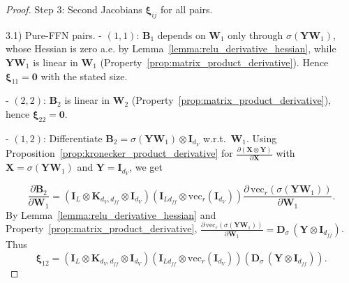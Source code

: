 \documentclass{article}
\begin{document}
\begin{proof}
Step 3: Second Jacobians $\boldsymbol{\xi}_{ij}$ for all pairs.

3.1) Pure-FFN pairs.
- $(1,1)$: $\mathbf{B}_1$ depends on $\mathbf{W}_1$ only through $\sigma(\mathbf{Y}\mathbf{W}_1)$, whose Hessian is zero a.e. by Lemma~\ref{lemma:relu_derivative_hessian}, while $\mathbf{Y}\mathbf{W}_1$ is linear in $\mathbf{W}_1$ (Property~\ref{prop:matrix_product_derivative}). Hence 
$\boldsymbol{\xi}_{11} = \mathbf{0}$ with the stated size.

- $(2,2)$: $\mathbf{B}_2$ is linear in $\mathbf{W}_2$ (Property~\ref{prop:matrix_product_derivative}), hence 
$\boldsymbol{\xi}_{22} = \mathbf{0}$.

- $(1,2)$: Differentiate $\mathbf{B}_2 = \sigma(\mathbf{Y}\mathbf{W}_1)\otimes \mathbf{I}_{d_V}$ w.r.t.\ $\mathbf{W}_1$. Using Proposition~\ref{prop:kronecker_product_derivative} for $\frac{\partial (\mathbf{X} \otimes \mathbf{Y})}{\partial \mathbf{X}}$ with $\mathbf{X}=\sigma(\mathbf{Y}\mathbf{W}_1)$ and $\mathbf{Y}=\mathbf{I}_{d_V}$, we get

\[\frac{\partial \mathbf{B}_2}{\partial \mathbf{W}_1}=\left( \mathbf{I}_L \otimes \mathbf{K}_{d_V, d_{ff}} \otimes \mathbf{I}_{d_V} \right)\left( \mathbf{I}_{L d_{ff}} \otimes \mathrm{vec}_r(\mathbf{I}_{d_V}) \right)\frac{\partial\, \mathrm{vec}_r(\sigma(\mathbf{Y}\mathbf{W}_1))}{\partial \mathbf{W}_1}.\]
By Lemma~\ref{lemma:relu_derivative_hessian} and Property~\ref{prop:matrix_product_derivative},
$\frac{\partial\, \mathrm{vec}_r(\sigma(\mathbf{Y}\mathbf{W}_1))}{\partial \mathbf{W}_1} = \mathbf{D}_\sigma\, (\mathbf{Y} \otimes \mathbf{I}_{d_{ff}})$.
Thus
\[\boldsymbol{\xi}_{12}= \left( \mathbf{I}_L \otimes \mathbf{K}_{d_V, d_{ff}} \otimes \mathbf{I}_{d_V} \right) \left( \mathbf{I}_{L d_{ff}} \otimes \mathrm{vec}_r(\mathbf{I}_{d_V}) \right)\left( \mathbf{D}_\sigma \, (\mathbf{Y} \otimes \mathbf{I}_{d_{ff}}) \right).\]


\end{proof}
\end{document}
